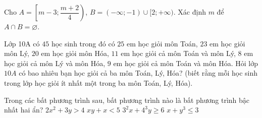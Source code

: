 \begin{bt}
	Cho $A=\left[m-3 ; \dfrac{m+2}{4}\right)$, $B=(-\infty ;-1) \cup [2 ;+\infty)$. Xác định $m$ để ${A \cap B=\varnothing}$.
\end{bt}

\begin{bt}
	Lớp 10A có $45$ học sinh trong đó có $25$ em học giỏi môn Toán, $23$ em học giỏi môn Lý, $20$ em học giỏi môn Hóa, $11$ em học giỏi cả môn Toán và môn Lý, $8$ em học giỏi cả môn Lý và môn Hóa, $9$ em học giỏi cả môn Toán và môn Hóa. Hỏi lớp $10A$ có bao nhiêu bạn học giỏi cả ba môn Toán, Lý, Hóa? (biết rằng mỗi học sinh trong lớp học giỏi ít nhất một trong ba môn Toán, Lý, Hóa).
\end{bt}

\begin{ex}
	Trong các bất phương trình sau, bất phương trình nào là bất phương trình bậc nhất hai ẩn?
	\choice
	{$2x^2+3y>4$}
	{$xy+x<5$}
	{\True $3^2x+4^3y\ge 6$}
	{$x+y^3\le 3$}
\end{ex}

